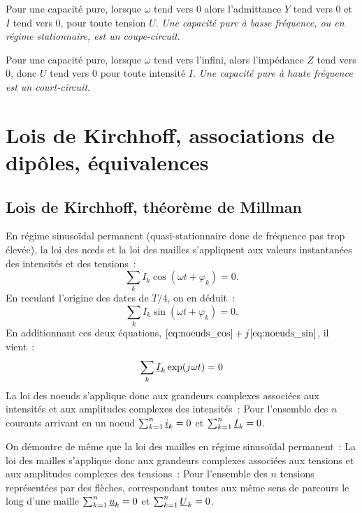         Pour une capacité pure, lorsque $\omega$ tend vers 0 alors l'admittance $Y$ tend vers 0 et $I$ tend vers 0, pour toute tension $U$. \emph{Une capacité pure à basse fréquence, ou en régime stationnaire, est un coupe-circuit}.

        Pour une capacité pure, lorsque $\omega$ tend vers l'infini, alors l'impédance $Z$ tend vers 0, donc $U$ tend vers 0 pour toute intensité $I$. \emph{Une capacité pure à haute fréquence est un court-circuit}.
\section{Lois de Kirchhoff, associations de dipôles, équivalences}
    \subsection{Lois de Kirchhoff, théorème de Millman}
        En régime sinusoïdal permanent (quasi-stationnaire donc de fréquence pas trop élevée), la loi des n\oe{}ds et la loi des mailles s'appliquent aux valeurs instantanées des intensités et des tensions~:
        \begin{equation}
            \label{eq:noeuds_cos}
            \sum_{k} I_k\cos(\omega t +\varphi_k) = 0.
        \end{equation}
        En reculant l'origine des dates de $T/4$, on en déduit~:
        \begin{equation}
            \label{eq:noeuds_sin}
            \sum_{k} I_k\sin(\omega t +\varphi_k) = 0.
        \end{equation}
        En additionnant ces deux équations, $\eqref{eq:noeuds_cos} + {j\mkern1mu} \eqref{eq:noeuds_sin}$, il vient~:
        \begin{equation}
            \label{eq:noeuds_cplx}
            \sum_k \underline{I}_k \exp({j\mkern1mu}\omega t) = 0
        \end{equation}
        La loi des noeuds s'applique donc aux grandeurs complexes associées aux intensités et aux amplitudes complexes des intensités~: Pour l'ensemble des $n$ courants arrivant en un noeud $\sum_{k=1}^n \underline{i}_k = 0$ et $\sum_{k=1}^n \underline{I}_k = 0$.

        On démontre de même que la loi des mailles en régime sinusoïdal permanent~: La loi des mailles s'applique donc aux grandeurs complexes associées aux tensions et aux amplitudes complexes des tensions~: Pour l'ensemble des $n$ tensions représentées par des flèches, correspondant toutes aux même sens de parcours le long d'une maille $\sum_{k=1}^n \underline{u}_k = 0$ et $\sum_{k=1}^n \underline{U}_k = 0$.

